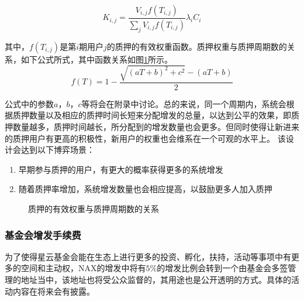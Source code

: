 \begin{equation}
  K_{i,j} = \frac{V_{i,j} f(T_{i,j})}{\sum_j V_{i,j} f(T_{i,j})} \lambda_i C_i
\end{equation}



其中，\(f(T_{i,j})\)是第\(i\)期用户\(j\)的质押的有效权重函数。质押权重与质押周期数的关系，如下公式所式，其中函数关系如图\ref{weight}所示。
  \begin{equation}
    f(T) = 1 - \frac{\sqrt{(aT+b)^2+c^2}-(aT+b)}{2}
  \end{equation}

公式中的参数$a$，$b$，$c$等将会在附录中讨论。总的来说，同一个周期内，系统会根据质押数量以及相应的质押时间长短来分配增发的总量，以达到公平的效果，即质押数量越多，质押时间越长，所分配到的增发数量也会更多。但同时使得让新进来的质押用户有更高的积极性，新用户的权重也会维系在一个可观的水平上。 该设计会达到以下博弈场景：

\begin{enumerate}[\hspace{1cm}(a)]
  \item 早期参与质押的用户，有更大的概率获得更多的系统增发
  \item 随着质押率增加，系统增发数量也会相应提高，以鼓励更多人加入质押
\end{enumerate}

\begin{figure}
\centering
    \caption{质押的有效权重与质押周期数的关系}\label{weight}
\end{figure}

\subsubsection{基金会增发手续费}
为了使得星云基金会能在生态上进行更多的投资、孵化，扶持，活动等事项中有更多的空间和主动权，NAX的增发中将有$5\%$的增发比例会转到一个由基金会多签管理的地址当中，该地址也将受公众监督的，其用途也是公开透明的方式。具体的活动内容在将来会有披露。



